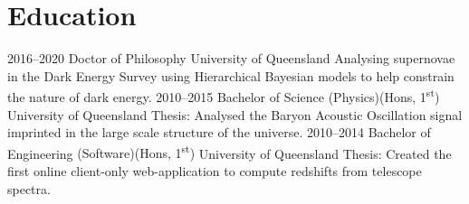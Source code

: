 \documentclass[]{friggeri-cv2}
\begin{document}
\section{Education}

\begin{entrylist}
\entry
{2016--2020}
{Doctor of Philosophy}
{University of Queensland}
{Analysing supernovae in the Dark Energy Survey using Hierarchical Bayesian models to help constrain the nature of dark energy.}
\entry
{2010--2015}
{Bachelor of Science {\normalfont (Physics)(Hons, 1\textsuperscript{st})}}
{University of Queensland}
{Thesis: Analysed the Baryon Acoustic Oscillation signal imprinted in the large scale structure of the universe.}
\entry
{2010--2014}
{Bachelor of Engineering {\normalfont (Software)(Hons, 1\textsuperscript{st})}}
{University of Queensland}
{Thesis: Created the first online client-only web-application to compute redshifts from telescope spectra. }
\end{entrylist}
\end{document}
